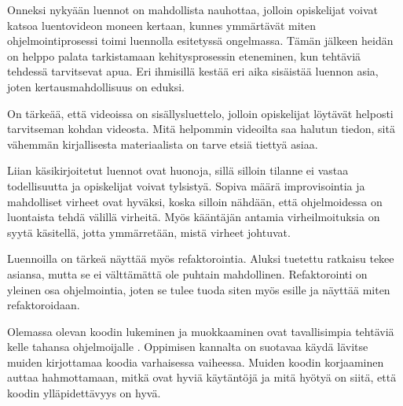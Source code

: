 Onneksi nykyään luennot on mahdollista nauhottaa, jolloin opiskelijat voivat
katsoa luentovideon moneen kertaan, kunnes ymmärtävät miten ohjelmointiprosessi
toimi luennolla esitetyssä ongelmassa. Tämän jälkeen heidän on helppo palata
tarkistamaan kehitysprosessin eteneminen, kun tehtäviä tehdessä tarvitsevat
apua. Eri ihmisillä kestää eri aika sisäistää luennon asia, joten
kertausmahdollisuus on eduksi.

On tärkeää, että videoissa on sisällysluettelo, jolloin opiskelijat löytävät
helposti tarvitseman kohdan videosta. Mitä helpommin videoilta saa halutun
tiedon, sitä vähemmän kirjallisesta materiaalista on tarve etsiä tiettyä asiaa.

Liian käsikirjoitetut luennot ovat huonoja, sillä silloin tilanne ei vastaa
todellisuutta ja opiskelijat voivat tylsistyä. Sopiva määrä improvisointia ja
mahdolliset virheet ovat hyväksi, koska silloin nähdään, että ohjelmoidessa on
luontaista tehdä välillä virheitä. Myös kääntäjän antamia virheilmoituksia on
syytä käsitellä, jotta ymmärretään, mistä virheet johtuvat.

Luennoilla on tärkeä näyttää myös refaktorointia. Aluksi tuetettu ratkaisu tekee
asiansa, mutta se ei välttämättä ole puhtain mahdollinen. Refaktorointi on
yleinen osa ohjelmointia, joten se tulee tuoda siten myös esille ja näyttää
miten refaktoroidaan.

Olemassa olevan koodin lukeminen ja muokkaaminen ovat tavallisimpia tehtäviä
kelle tahansa ohjelmoijalle \cite{Kolling:2008}. Oppimisen kannalta on suotavaa
käydä lävitse muiden kirjottamaa koodia varhaisessa vaiheessa. Muiden koodin
korjaaminen auttaa hahmottamaan, mitkä ovat hyviä käytäntöjä ja mitä hyötyä on
siitä, että koodin ylläpidettävyys on hyvä.

